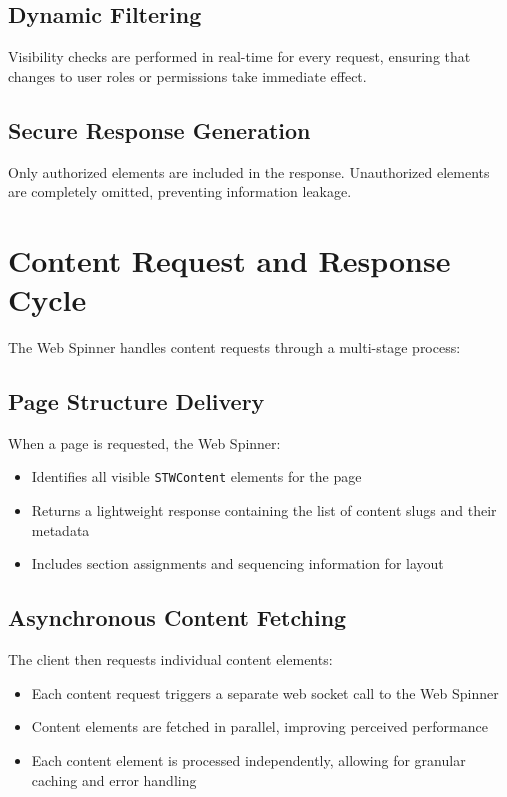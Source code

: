 \subsection{Dynamic Filtering}

Visibility checks are performed in real-time for every request, ensuring that changes to user roles or permissions take immediate effect.

\subsection{Secure Response Generation}

Only authorized elements are included in the response. Unauthorized elements are completely omitted, preventing information leakage.

\section{Content Request and Response Cycle}
\label{sec:content-cycle}

The Web Spinner handles content requests through a multi-stage process:

\subsection{Page Structure Delivery}

When a page is requested, the Web Spinner:
\begin{itemize}
	\item Identifies all visible \texttt{STWContent} elements for the page
	\item Returns a lightweight response containing the list of content slugs and their metadata
	\item Includes section assignments and sequencing information for layout
\end{itemize}

\subsection{Asynchronous Content Fetching}

The client then requests individual content elements:
\begin{itemize}
	\item Each content request triggers a separate web socket call to the Web Spinner
	\item Content elements are fetched in parallel, improving perceived performance
	\item Each content element is processed independently, allowing for granular caching and error handling
\end{itemize}

